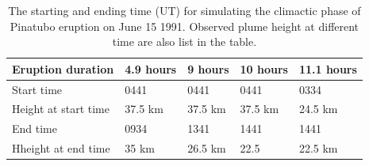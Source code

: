 \begin{table}[htp]
\centering
      \caption{The starting and ending time (UT) for simulating the climactic phase of Pinatubo eruption on June 15 1991. Observed plume height \citep{holasek1996satellite} at different time are also list in the table.}		
	  \begin{tabular}{p{45mm}p{23mm}p{23mm}p{23mm}p{23mm}}
	    \hline
        Eruption duration & 4.9 hours & 9 hours & 10 hours & 11.1 hours \\
	    \hline
	    Start time & 0441 & 0441 & 0441 & 0334 \\
	    Height at start time & 37.5 km & 37.5 km  & 37.5 km  & 24.5 km \\
	    
	    End time   & 0934 & 1341 & 1441 & 1441  \\
	    	Hheight at end time & 35 km & 26.5 km & 22.5 & 22.5 km \\
	    \hline
	  \end{tabular}
	  \label{tab:Pinatubo-eruption-duration}
\end{table}

